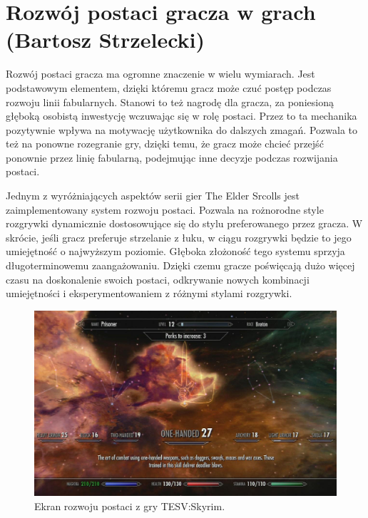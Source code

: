 \section{Rozwój postaci gracza w grach (Bartosz Strzelecki)}\label{s:wpr_progres}
Rozwój postaci gracza ma ogromne znaczenie w wielu wymiarach. Jest podstawowym elementem, dzięki któremu gracz może czuć postęp podczas rozwoju linii fabularnych. 
Stanowi to też nagrodę dla gracza, za poniesioną głęboką osobistą inwestycję wczuwając się w rolę postaci. Przez to ta mechanika pozytywnie
wpływa na motywację użytkownika do dalszych zmagań. Pozwala to też na ponowne rozegranie gry, dzięki temu, że gracz może chcieć przejść
ponownie przez linię fabularną, podejmując inne decyzje podczas rozwijania postaci.

Jednym z wyróżniających aspektów serii gier The Elder Srcolls jest zaimplementowany system rozwoju postaci. Pozwala na rożnorodne
style rozgrywki dynamicznie dostosowujące się do stylu preferowanego przez gracza. W skrócie, jeśli gracz preferuje strzelanie z łuku,
w ciągu rozgrywki będzie to jego umiejętność o najwyższym poziomie. Głęboka złożoność tego systemu sprzyja długoterminowemu zaangażowaniu.
Dzięki czemu gracze poświęcają dużo więcej czasu na doskonalenie swoich postaci, odkrywanie nowych kombinacji umiejętności i eksperymentowaniem z różnymi
stylami rozgrywki.

\begin{figure}[h]
\centering
\includegraphics[width=1.0\textwidth]{images/tes.jpg}
\caption{Ekran rozwoju postaci z gry TESV:Skyrim.}
\end{figure}
